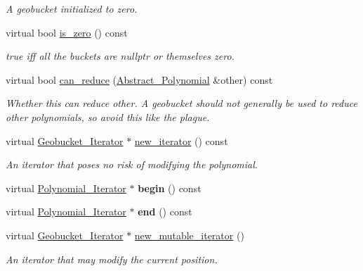 \begin{Indent}
\begin{DoxyCompactItemize}
\begin{DoxyCompactList}\small\item\em A geobucket initialized to zero. \end{DoxyCompactList}\item 
virtual bool \hyperlink{class_polynomial___geobucket_a971ed46f9d5d738671f2fb832c7bb52b}{is\+\_\+zero} () const
\begin{DoxyCompactList}\small\item\em {\ttfamily true} iff all the buckets are {\ttfamily nullptr} or themselves zero. \end{DoxyCompactList}\item 
\mbox{\label{class_polynomial___geobucket_ab78d17d4edf8074b81c9fc4c13c0ba83}} 
virtual bool \hyperlink{class_polynomial___geobucket_ab78d17d4edf8074b81c9fc4c13c0ba83}{can\+\_\+reduce} (\hyperlink{class_abstract___polynomial}{Abstract\+\_\+\+Polynomial} \&other) const
\begin{DoxyCompactList}\small\item\em Whether {\ttfamily this} can reduce {\ttfamily other}. A geobucket should not generally be used to reduce other polynomials, so avoid this like the plague. \end{DoxyCompactList}\item 
\mbox{\label{class_polynomial___geobucket_a01ba6bad35f04be113e5f0825a810e4c}} 
virtual \hyperlink{class_geobucket___iterator}{Geobucket\+\_\+\+Iterator} $\ast$ \hyperlink{class_polynomial___geobucket_a01ba6bad35f04be113e5f0825a810e4c}{new\+\_\+iterator} () const
\begin{DoxyCompactList}\small\item\em An iterator that poses no risk of modifying the polynomial. \end{DoxyCompactList}\item 
\mbox{\label{class_polynomial___geobucket_a9eada91bec3b3d649936f93cc50330e4}} 
virtual \hyperlink{class_polynomial___iterator}{Polynomial\+\_\+\+Iterator} $\ast$ {\bfseries begin} () const
\item 
\mbox{\label{class_polynomial___geobucket_a61b255f42f043aa3ff0d195e36f6b30f}} 
virtual \hyperlink{class_polynomial___iterator}{Polynomial\+\_\+\+Iterator} $\ast$ {\bfseries end} () const
\item 
\mbox{\label{class_polynomial___geobucket_ab2b399ff1904f2cb3b3ba6f505dc10a7}} 
virtual \hyperlink{class_geobucket___iterator}{Geobucket\+\_\+\+Iterator} $\ast$ \hyperlink{class_polynomial___geobucket_ab2b399ff1904f2cb3b3ba6f505dc10a7}{new\+\_\+mutable\+\_\+iterator} ()
\begin{DoxyCompactList}\small\item\em An iterator that may modify the current position. \end{DoxyCompactList}\end{DoxyCompactItemize}
\end{Indent}

